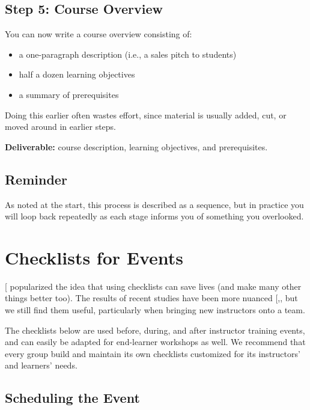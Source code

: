 \section{Step 5: Course Overview}\label{step-5-course-overview}

You can now write a course overview consisting of:

\begin{itemize}
\item
  a one-paragraph description (i.e., a sales pitch to students)
\item
  half a dozen learning objectives
\item
  a summary of prerequisites
\end{itemize}

Doing this earlier often wastes effort, since material is usually added,
cut, or moved around in earlier steps.

\textbf{Deliverable:} course description, learning objectives, and
prerequisites.

\section{Reminder}\label{reminder}

As noted at the start, this process is described as a sequence, but in
practice you will loop back repeatedly as each stage informs you of
something you overlooked.

\chapter{Checklists for Events}\label{s:events}

{[}\protect[\hyperlink{b:Gawa2007}{Gawa2007}]{]} popularized the idea that using checklists can save
lives (and make many other things better too). The results of recent
studies have been more nuanced {[},\protect[\hyperlink{b:Urba2014}{Urba2014}]{]}, but we still
find them useful, particularly when bringing new instructors onto a
team.

The checklists below are used before, during, and after instructor
training events, and can easily be adapted for end-learner workshops as
well. We recommend that every group build and maintain its own
checklists customized for its instructors' and learners' needs.

\section{Scheduling the Event}\label{scheduling-the-event}

